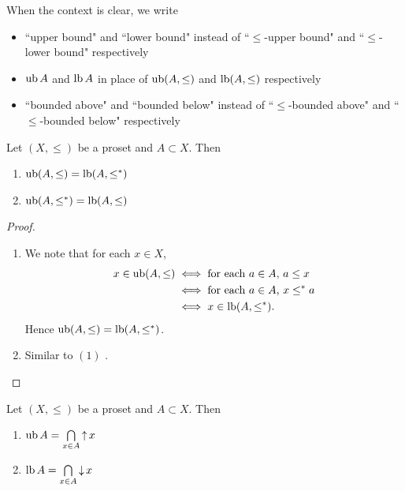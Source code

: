 \documentclass{book}
\begin{document}
	\begin{note}
		When the context is clear, we write 
		\begin{itemize}
			\item ``upper bound" and ``lower bound" instead of ``$\leq$-upper bound" and ``$\leq$-lower bound" respectively
			\item $\operatorname{ub} A$ and $\operatorname{lb} A$ in place of $\operatorname{ub} (A, \leq)$ and $\operatorname{lb} (A, \leq)$  respectively
			\item ``bounded above" and ``bounded below" instead of ``$\leq$-bounded above" and ``$\leq$-bounded below" respectively
		\end{itemize}
	\end{note}
	
	\begin{ex} 
		Let $(X, \leq)$ be a proset and $A \subset X$. Then 
		\begin{enumerate}
			\item $\operatorname{ub} (A, \leq) = \operatorname{lb} (A, \leq^*)$
			\item $\operatorname{ub} (A, \leq^*) = \operatorname{lb} (A, \leq)$
		\end{enumerate}
	\end{ex}
	
	\begin{proof}\
		\begin{enumerate}
			\item 
			We note that for each $x \in X$,
			\begin{align*}
				x \in \operatorname{ub} (A, \leq)
				& \iff \text{for each $a \in A$, $a \leq x$} \\
				& \iff \text{for each $a \in A$, $x \leq^* a$} \\
				&\iff x \in \operatorname{lb}(A, \leq^*).
			\end{align*}
			Hence $\operatorname{ub} (A, \leq) = \operatorname{lb} (A, \leq^*)$.
			\item Similar to $(1)$ .
		\end{enumerate}
	\end{proof}
	
	\begin{ex} 
		Let $(X, \leq)$ be a proset and $A \subset X$. Then 
		\begin{enumerate}
			\item $\operatorname{ub} A = \bigcap\limits_{x \in A} \operatorname{\uparrow} x$
			\item $\operatorname{lb} A = \bigcap\limits_{x \in A} \operatorname{\downarrow} x$
		\end{enumerate}
	\end{ex}
	
\end{document}
